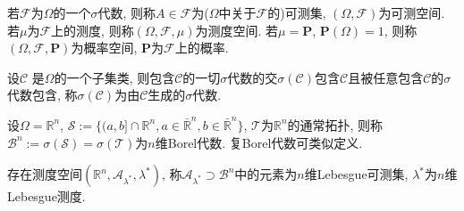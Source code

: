 \begin{definition}
    若$\mathcal{F}$为$\Omega$的一个$\sigma$代数, 则称$A\in\mathcal{F}$为($\Omega$中关于$\mathcal{F}$的)可测集, $(\Omega,\mathcal{F})$为可测空间. 若$\mu$为$\mathcal{F}$上的测度, 则称$(\Omega,\mathcal{F},\mu)$为测度空间. 若$\mu=\mathbf{P}$, $\mathbf{P}(\Omega)=1$, 则称$(\Omega,\mathcal{F},\mathbf{P})$为概率空间, $\mathbf{P}$为$\mathcal{F}$上的概率.
\end{definition}

\begin{definition}
    设$\mathcal{C}$ 是$\Omega$的一个子集类, 则包含$\mathcal{C}$的一切$\sigma$代数的交$\sigma(\mathcal{C})$包含$\mathcal{C}$且被任意包含$\mathcal{C}$的$\sigma$代数包含, 称$\sigma(\mathcal{C})$为由$\mathcal{C}$生成的$\sigma$代数.
\end{definition}

\begin{definition}
    设$\Omega=\mathbb{R}^n$, $\mathscr{S}:=\{(a,b]\cap\mathbb{R}^n,a\in\bar{\mathbb{R}}^n,b\in\bar{\mathbb{R}}^n\}$, $\mathscr{T}$为$\mathbb{R}^n$的通常拓扑, 则称$\mathscr{B}^n:=\sigma(\mathscr{S})=\sigma(\mathscr{T})$为$n$维Borel代数. 复Borel代数可类似定义.
\end{definition}

\begin{definition}
    存在测度空间$(\mathbb{R}^n,\mathscr{A}_{\lambda^*},\lambda^*)$, 称$\mathscr{A}_{\lambda^*}\!\!\supset\!\!\mathscr{B}^n$中的元素为$n$维Lebesgue可测集, $\lambda^*$为$n$维Lebesgue测度.
\end{definition}

